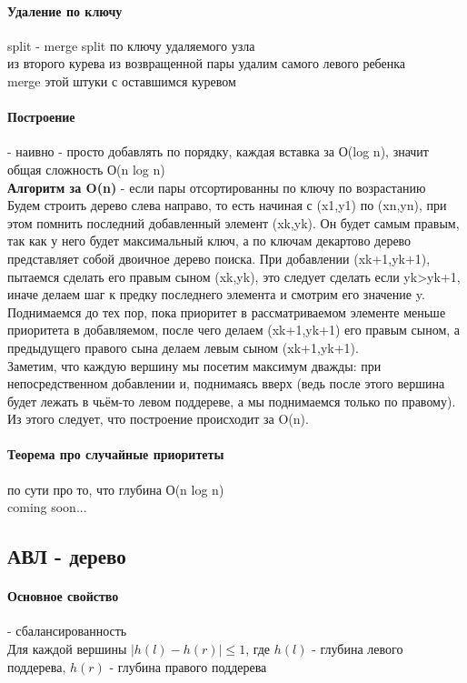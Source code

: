 \documentclass[a4paper,10pt]{article}
\begin{document}
\paragraph{Удаление по ключу} split - merge
split по ключу удаляемого узла\\
из второго курева из возвращенной пары удалим самого левого ребенка\\
merge этой штуки  с оставшимся куревом
\paragraph{Построение} - наивно - просто добавлять по порядку, каждая вставка за  О(log n), значит общая сложность  О(n log n)\\

\textbf{Алгоритм за O(n)} - если пары отсортированны по ключу по возрастанию\\
Будем строить дерево слева направо, то есть начиная с (x1,y1) по (xn,yn), при этом помнить последний добавленный элемент (xk,yk). Он будет самым правым, так как у него будет максимальный ключ, а по ключам декартово дерево представляет собой двоичное дерево поиска. При добавлении (xk+1,yk+1), пытаемся сделать его правым сыном (xk,yk), это следует сделать если yk>yk+1, иначе делаем шаг к предку последнего элемента и смотрим его значение y. Поднимаемся до тех пор, пока приоритет в рассматриваемом элементе меньше приоритета в добавляемом, после чего делаем (xk+1,yk+1) его правым сыном, а предыдущего правого сына делаем левым сыном (xk+1,yk+1).\\
Заметим, что каждую вершину мы посетим максимум дважды: при непосредственном добавлении и, поднимаясь вверх (ведь после этого вершина будет лежать в чьём-то левом поддереве, а мы поднимаемся только по правому). Из этого следует, что построение происходит за O(n).
\paragraph{Теорема про случайные приоритеты} по сути про то, что глубина О(n log n)\\
coming soon...\\

\subsection{АВЛ - дерево}

	\paragraph{Основное свойство} - сбалансированность \\
	Для каждой вершины $|h(l) - h(r)| \leq 1$, где $h(l)$ - глубина левого поддерева, $h(r)$ - глубина правого поддерева \\
	
\end{document}
